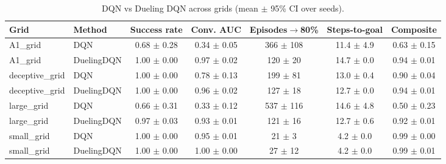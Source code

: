 \begin{table}[t]
\centering
\caption{DQN vs Dueling DQN across grids (mean $\pm$ 95\% CI over seeds).}
\begin{tabular}{llccccc}
\toprule
Grid & Method & Success rate & Conv. AUC & Episodes$\rightarrow$80\% & Steps-to-goal & Composite \\
\midrule
A1\_grid & DQN & 0.68 $\pm$ 0.28 & 0.34 $\pm$ 0.05 & 366 $\pm$ 108 & 11.4 $\pm$ 4.9 & 0.63 $\pm$ 0.15 \\
A1\_grid & DuelingDQN & 1.00 $\pm$ 0.00 & 0.97 $\pm$ 0.02 & 120 $\pm$ 20 & 14.7 $\pm$ 0.0 & 0.94 $\pm$ 0.01 \\
deceptive\_grid & DQN & 1.00 $\pm$ 0.00 & 0.78 $\pm$ 0.13 & 199 $\pm$ 81 & 13.0 $\pm$ 0.4 & 0.90 $\pm$ 0.04 \\
deceptive\_grid & DuelingDQN & 1.00 $\pm$ 0.00 & 0.96 $\pm$ 0.02 & 127 $\pm$ 18 & 12.7 $\pm$ 0.0 & 0.94 $\pm$ 0.01 \\
large\_grid & DQN & 0.66 $\pm$ 0.31 & 0.33 $\pm$ 0.12 & 537 $\pm$ 116 & 14.6 $\pm$ 4.8 & 0.50 $\pm$ 0.23 \\
large\_grid & DuelingDQN & 0.97 $\pm$ 0.03 & 0.93 $\pm$ 0.01 & 121 $\pm$ 16 & 12.7 $\pm$ 0.6 & 0.92 $\pm$ 0.01 \\
small\_grid & DQN & 1.00 $\pm$ 0.00 & 0.95 $\pm$ 0.01 & 21 $\pm$ 3 & 4.2 $\pm$ 0.0 & 0.99 $\pm$ 0.00 \\
small\_grid & DuelingDQN & 1.00 $\pm$ 0.00 & 1.00 $\pm$ 0.00 & 27 $\pm$ 12 & 4.2 $\pm$ 0.0 & 0.99 $\pm$ 0.01 \\
\bottomrule
\end{tabular}
\end{table}
